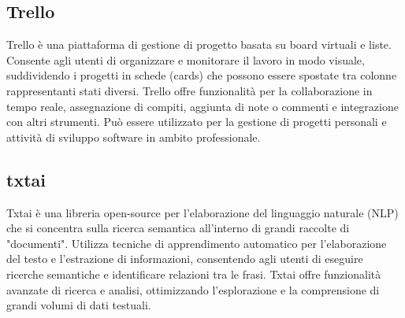 \vspace{2em}
\subsection*{Trello}
\par Trello è una piattaforma di gestione di progetto basata su board virtuali e liste. Consente agli utenti di organizzare e monitorare il lavoro in modo visuale, suddividendo i progetti in schede (cards) che possono essere spostate tra colonne rappresentanti stati diversi. Trello offre funzionalità per la collaborazione in tempo reale, assegnazione di compiti, aggiunta di note o commenti e integrazione con altri strumenti. Può essere utilizzato per la gestione di progetti personali e attività di sviluppo software in ambito professionale.

\vspace{2em}
\subsection*{txtai}
\par Txtai è una libreria open-source per l'elaborazione del linguaggio naturale (NLP) che si concentra sulla ricerca semantica all'interno di grandi raccolte di "documenti". Utilizza tecniche di apprendimento automatico per l'elaborazione del testo e l'estrazione di informazioni, consentendo agli utenti di eseguire ricerche semantiche e identificare relazioni tra le frasi. Txtai offre funzionalità avanzate di ricerca e analisi, ottimizzando l'esplorazione e la comprensione di grandi volumi di dati testuali.
